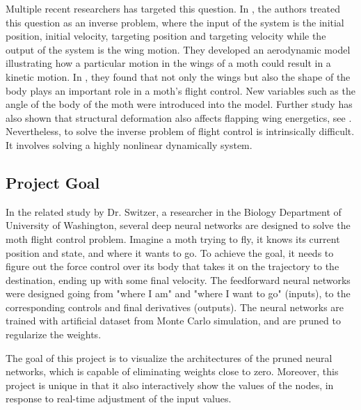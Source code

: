 \documentclass[sigchi]{acmart}
\begin{document}
Multiple recent researchers has targeted this question. In \cite{Hedrick3114}, the authors treated this question as an inverse problem, where the input of the system is the initial position, initial velocity, targeting position and targeting velocity while the output of the system is the wing motion. They developed an aerodynamic model illustrating how a particular motion in the wings of a moth could result in a kinetic motion. In \cite{Dyhr1523}, they found that not only the wings but also the shape of the body plays an important role in a moth's flight control. New variables such as the angle of the body of the moth were introduced into the model. Further study has also shown that structural deformation also affects flapping wing energetics, see \citep{Jankauski_2018}. Nevertheless, to solve the inverse problem of flight control is intrinsically difficult. It involves solving a highly nonlinear dynamically system. 

\subsection{Project Goal}
In the related study by Dr. Switzer, a researcher in the Biology Department of University of Washington, several deep neural networks are designed to solve the moth flight control problem. Imagine a moth trying to fly, it knows its current position and state, and where it wants to go. To achieve the goal, it needs to figure out the force control over its body that takes it on the trajectory to the destination, ending up with some final velocity. The feedforward neural networks were designed going from "where I am" and "where I want to go" (inputs), to the corresponding controls and final derivatives (outputs). The neural networks are trained with artificial dataset from Monte Carlo simulation, and are pruned to regularize the weights. 

The goal of this project is to visualize the architectures of the pruned neural networks, which is capable of eliminating weights close to zero. Moreover, this project is unique in that it also interactively show the values of the nodes, in response to real-time adjustment of the input values.
\end{document}
